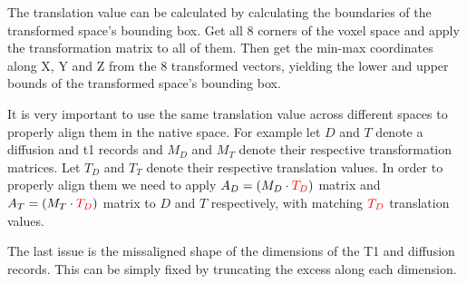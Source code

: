 The translation value can be calculated by calculating the boundaries of the transformed space's bounding box. Get all 8 corners of the voxel space and apply the transformation matrix to all of them. Then get the min-max coordinates along X, Y and Z from the 8 transformed vectors, yielding the lower and upper bounds of the transformed space's bounding box.\par

It is very important to use the same translation value across different spaces to properly align them in the native space. For example let $D$ and $T$ denote a diffusion and t1 records and $M_D$ and $M_T$ denote their respective transformation matrices. Let $T_D$ and $T_T$ denote their respective translation values. In order to properly align them we need to apply $A_D = (M_D \cdot {\color{red}T_D})$ matrix and $A_T = (M_T \cdot {\color{red}T_D})$ matrix to $D$ and $T$ respectively, with matching ${\color{red}T_D}$ translation values.\par

The last issue is the missaligned shape of the dimensions of the T1 and diffusion records. This can be simply fixed by truncating the excess along each dimension.

